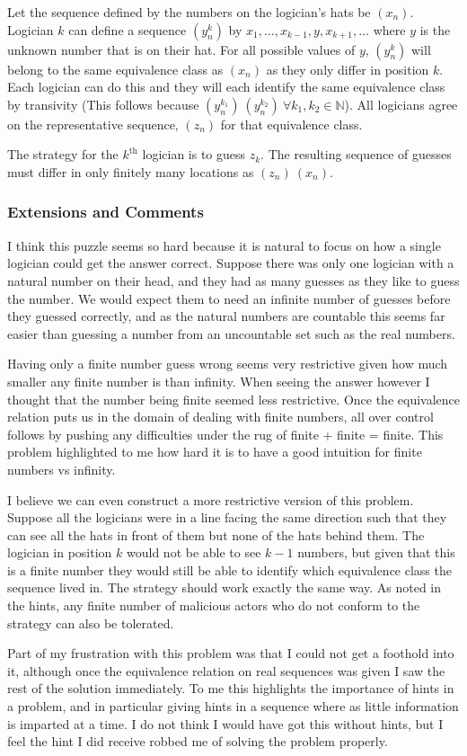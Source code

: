 Let the sequence defined by the numbers on the logician's hats be $(x_n)$. Logician $k$ can define a sequence $(y^k_n)$ by $x_1, \dots, x_{k-1}, y, x_{k+1}, \dots$ where $y$ is the unknown number that is on their hat. For all possible values of $y$, $(y^k_n)$ will belong to the same equivalence class as $(x_n)$ as they only differ in position $k$. Each logician can do this and they will each identify the same equivalence class by transivity (This follows because $(y_n^{k_1}) ~ (y_n^{k_2}) \  \forall k_1, k_2 \in \mathbb{N}$). All logicians agree on the representative sequence, $(z_n)$ for that equivalence class.

The strategy for the $k^\text{th}$ logician is to guess $z_k$. The resulting sequence of guesses must differ in only finitely many locations as $(z_n) ~ (x_n)$.

\subsubsection{Extensions and Comments}

I think this puzzle seems so hard because it is natural to focus on how a single logician could get the answer correct. Suppose there was only one logician with a natural number on their head, and they had as many guesses as they like to guess the number. We would expect them to need an infinite number of guesses before they guessed correctly, and as the natural numbers are countable this seems far easier than guessing a number from an uncountable set such as the real numbers.

Having only a finite number guess wrong seems very restrictive given how much smaller any finite number is than infinity. When seeing the answer however I thought that the number being finite seemed less restrictive. Once the equivalence relation puts us in the domain of dealing with finite numbers, all over control follows by pushing any difficulties under the rug of finite + finite = finite. This problem highlighted to me how hard it is to have a good intuition for finite numbers vs infinity.

I believe we can even construct a more restrictive version of this problem. Suppose all the logicians were in a line facing the same direction such that they can see all the hats in front of them but none of the hats behind them. The logician in position $k$ would not be able to see $k - 1$ numbers, but given that this is a finite number they would still be able to identify which equivalence class the sequence lived in. The strategy should work exactly the same way. As noted in the hints, any finite number of malicious actors who do not conform to the strategy can also be tolerated.

Part of my frustration with this problem was that I could not get a foothold into it, although once the equivalence relation on real sequences was given I saw the rest of the solution immediately. To me this highlights the importance of hints in a problem, and in particular giving hints in a sequence where as little information is imparted at a time. I do not think I would have got this without hints, but I feel the hint I did receive robbed me of solving the problem properly.